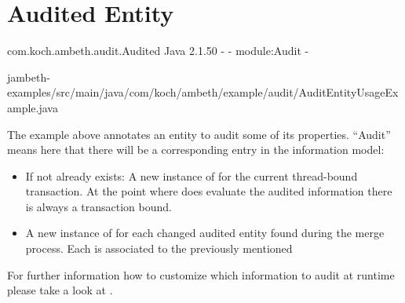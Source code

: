 \section{Audited Entity}
\label{feature:AuditedEntity}
\ClearAPI
\TODO
\feature
	{com.koch.ambeth.audit.Audited}
	{Java}
	{2.1.50}
	{-}
	{-}
	{module:Audit}
	{-}

	{jambeth-examples/src/main/java/com/koch/ambeth/example/audit/AuditEntityUsageExample.java}

The example above annotates an entity to audit some of its properties. ``Audit'' means here that there will be a corresponding entry in the information model:

\begin{itemize}
	\item If not already exists: A new instance of  for the current thread-bound transaction. At the point where  does evaluate the audited information there is always a transaction bound.
	\item A new instance of  for each changed audited entity found during the merge process. Each  is associated to the previously mentioned 
\end{itemize}

For further information how to customize which information to audit at runtime please take a look at .


 